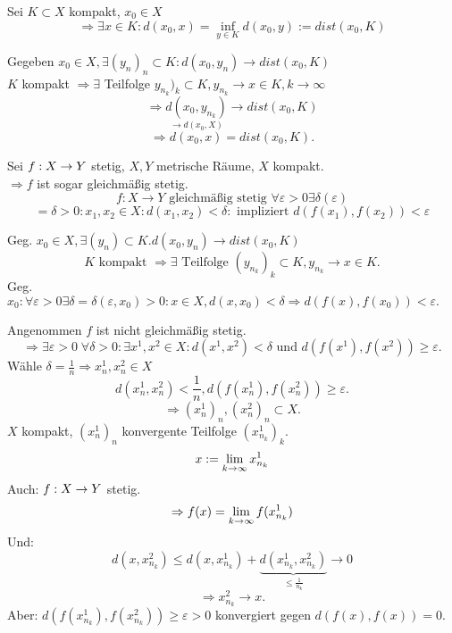\documentclass[../ana2.tex]{subfiles}
\begin{document}
\begin{bem}
    Sei \(K \subset X\) kompakt, \(x_0 \in X\)
    \[ \Rightarrow \exists x \in K: d(x_0, x) 
    = \underset{y \in K}{\inf} d(x_0, y) 
    := dist(x_0, K) \]
\end{bem}
\begin{bew}
    Gegeben \( x_0 \in X, \exists (y_n)_n \subset K: 
    d(x_0, y_n) \rightarrow dist(x_0, K) \) \\
    \(K\) kompakt \( \Rightarrow \exists \) Teilfolge 
    \(y_{n_k})_k \subset K, y_{n_k} \rightarrow x \in K, 
    k \rightarrow \infty\)    
    \[ \Rightarrow \underset{\rightarrow d(x_0, X)}{d(x_0, y_{n_k})} 
    \rightarrow dist(x_0, K) \]
    \[ \Rightarrow d(x_0, x) = dist(x_0, K). \]
\end{bew}
\begin{satz}
    Sei \( f:X\rightarrow Y \) stetig, 
    \( X, Y \) metrische Räume, \(X\)
    kompakt. \\
    \( \Rightarrow f \) ist sogar gleichmäßig 
    stetig.
    \[ f: X \rightarrow Y \text{ gleichmäßig stetig }
    \forall \varepsilon > 0 \exists 
    \delta(\varepsilon) \]
    \[ = \delta > 0:
    x_1, x_2 \in X: d(x_1, x_2) < \delta:
    \text{ impliziert } d(f(x_1), f(x_2)) < \varepsilon \]
\end{satz}
\begin{bew}
    Geg. \( x_0 \in X, \exists (y_n) \subset K. d(x_0, y_n) 
    \rightarrow dist(x_0, K) \)
    \[ K \text{ kompakt } \Rightarrow \exists \text{ Teilfolge } 
    (y_{n_k})_k \subset K, y_{n_k} \rightarrow x \in K. \]
    Geg. \( x_0: \forall \varepsilon > 0 \exists \delta 
    = \delta(\varepsilon, x_0) > 0:
    x \in X, d(x, x_0) < \delta \Rightarrow d(f(x), f(x_0)) 
    < \varepsilon. \)

    Angenommen \( f \) ist nicht gleichmäßig stetig.
    \[ \Rightarrow \exists \varepsilon > 0 
    \;\forall \delta > 0: \exists x^1, x^2 \in X: 
    d(x^1, x^2) < \delta 
    \text{ und } d(f(x^1), f(x^2)) \geq \varepsilon. \]
    Wähle \( \delta = \frac{1}{n} \Rightarrow x_n^1, x_n^2
    \in X \)
    \[ d(x_n^1, x_n^2) < \frac{1}{n}, d(f(x_n^1), f(x_n^2)) 
    \geq \varepsilon. \]
    \[ \Rightarrow (x_n^1)_n, (x_n^2)_n \subset X. \]
    \( X \) kompakt, \( (x_n^1)_n \) konvergente Teilfolge 
    \( (x_{n_k}^1)_k \).
    \[ x := \lim\limits_{k\rightarrow\infty} x_{n_k}^1 \]
    Auch: \( f:X\rightarrow Y \) stetig.
    \[ \Rightarrow f(x) = \lim\limits_{k\rightarrow\infty} f(x_{n_k}^1) \]
    Und: \[ d(x, x_{n_k}^2) \leq d(x, x_{n_k}^1) 
    + \underbrace{d(x_{n_k}^1, x_{n_k}^2)}_{\leq \frac{1}{n_k}} 
    \rightarrow 0 \]
    \[ \Rightarrow x_{n_k}^2 \rightarrow x. \]
    Aber: \( d(f(x_{n_k}^1), f(x_{n_k}^2)) \geq \varepsilon > 0 \)
    konvergiert gegen \( d(f(x), f(x)) = 0 \). \Lightning{}
\end{bew}
\end{document}
